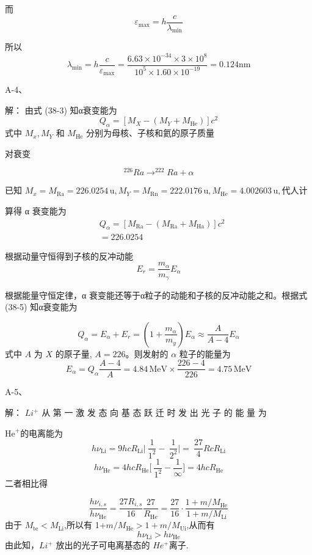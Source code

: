 \documentclass{article}
\begin{document}
\begin{CJK*}{UTF8}{gbsn}
而
\[
\varepsilon_{\max} = h \frac{c}{\lambda_{\min}}
\]

所以
\[
\lambda_{\min} = h \frac{c}{\varepsilon_{\max}} = \frac{6.63 \times 10^{-34} \times 3 \times 10^8}{10^5 \times 1.60 \times 10^{-19}} = 0.124 \text{nm}
\]

A-4、

解： 由式 (38-3) 知α衰变能为
\[ Q_{\alpha} = \left[ M_{X} - \left( M_{Y} + M_{\mathrm{He}} \right) \right]c^{2} \]
式中 \( M_x, M_Y \) 和 \( M_\mathrm{He} \) 分别为母核、子核和氦的原子质量

对衰变

\[ ^{226}Ra \rightarrow ^{222}Ra + \alpha \]

已知 \( M_{x} = M_{\mathrm{Ra}} = 226.0254 \, \text{u}, M_{Y} = M_{\mathrm{Rn}} = 222.0176 \, \text{u}, M_{\mathrm{He}} = 4.002603 \, \text{u}, \text{代人计} \)

算得 α 衰变能为
\[ 
\begin{aligned}
& Q_{\alpha} = \left[ M_{\mathrm{Ra}} - \left( M_{\mathrm{Ra}} + M_{\mathrm{Ha}} \right) \right]c^{2} \\
& = 226.0254
\end{aligned}
\]

根据动量守恒得到子核的反冲动能
\[ E_{r} = \frac{m_{\alpha}}{m_{\gamma}}E_{\alpha} \]

根据能量守恒定律，α 衰变能还等于α粒子的动能和子核的反冲动能之和。根据式 (38-5) 知α衰变能为

\[ Q_{\alpha} = E_{\alpha} + E_{r} = \left(1 + \frac{m_{\alpha}}{m_{y}}\right)E_{\alpha} \approx \frac{A}{A-4}E_{\alpha} \]
式中 \( A \) 为 \( X \) 的原子量, \( A = 226 \)。则发射的 \( \alpha \) 粒子的能量为
\[ E_{\alpha} = Q_{\alpha} \frac{A-4}{A} = 4.84 \, \text{MeV} \times \frac{226-4}{226} = 4.75 \, \text{MeV} \]

 A-5、
 
解： \( Li^+ \) 从 第 一 激 发 态 向 基 态 跃 迁 时 发 出 光 子 的 能 量 为


$\mathrm{He}^{+}$的电离能为
$$h\nu_{\mathrm{Li}}=9hcR_{\mathrm{Li}}\Big|\:\frac{1}{1^{2}}-\:\frac{1}{2^{2}}\Big|=\:\frac{27}{4}RcR_{\mathrm{Li}}$$
$$h\nu_{\mathrm{He}}=4hcR_{\mathrm{He}}\Big[\:\frac{1}{1^{2}}-\frac{1}{\infty}\Big]=4hcR_{\mathrm{He}}$$
二者相比得

$$\frac{h\nu_{i,s}}{h\nu_{\mathrm{He}}}=\frac{27R_{i,s}}{16}\frac{27}{R_{\mathrm{He}}}=\frac{27}{16}\cdot\frac{1+m/M_{\mathrm{He}}}{1+m/M_{\mathrm{Li}}}$$
由于 $M_{\mathrm{te}}<M_{\mathrm{Li}}$,所以有 1+$m/M_{\mathrm{He}}>1+m/M_{\mathrm{Ui}}$,从而有
$$h\nu_{\mathrm{Li}}>h\nu_{\mathrm{He}}$$
由此知，\( Li^+ \) 放出的光子可电离基态的 \( He^+ \)离子.


\end{CJK*}
\end{document}
